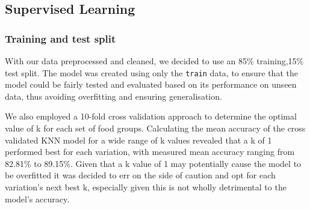 \documentclass[11pt]{article}
\begin{document}
\subsection{Supervised Learning}

\subsubsection{Training and test split}

With our data preprocessed and cleaned, we decided to use an 85\% training,15\% test split.  The model was created using only the \verb|train| data, to ensure that the model could be fairly tested and evaluated based on its performance on unseen data, thus avoiding overfitting and ensuring generalisation. 

We also employed a 10-fold cross validation approach to determine the optimal value of k for each set of food groups. Calculating the mean accuracy of the cross validated KNN model for a wide range of k values revealed that a k of 1 performed best for each variation, with measured mean accuracy ranging from 82.81\% to 89.15\%. Given that a k value of 1 may potentially cause the model to be overfitted it was decided to err on the side of caution and opt for each variation's next best k, especially given this is not wholly detrimental to the model's accuracy. 
\end{document}
